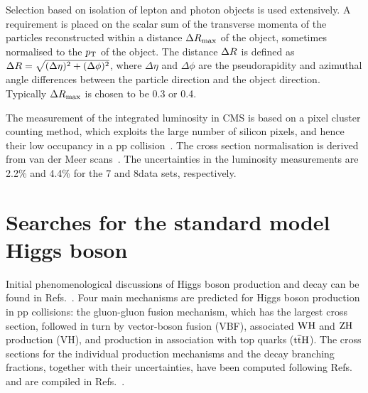\documentclass[11pt,twoside,a4paper,cmspaper,final]{cms-tdr}
\begin{document}
Selection based on isolation of lepton and photon objects is used extensively.
A requirement is placed on the scalar sum of the transverse momenta of the particles reconstructed within a
distance $\Delta R_\text{max}$ of the object, sometimes normalised to the $p_{\mathrm{T}}$ of the object. The distance $\Delta R$ is defined as $\Delta R = \sqrt{(\Delta\eta)^2+(\Delta\phi)^2}$, where
$\Delta\eta$ and $\Delta\phi$ are the pseudorapidity and azimuthal angle
differences between the particle direction and the object direction.
Typically  $\Delta R_\text{max}$ is chosen to be 0.3 or 0.4.

The measurement of the integrated luminosity in CMS is based on a
pixel cluster counting method, which exploits the large number of silicon
pixels, and hence their low occupancy in a {pp} collision~\cite{CMS-PAS-SMP-12-008}.
The cross section normalisation is derived from van der Meer
scans~\cite{vanderMeer:296752}.
The uncertainties in the luminosity measurements are 2.2\% and 4.4\% for the 7\TeV
and 8\TeV data sets, respectively.

\section{Searches for the standard model Higgs boson}\label{sec:Strategy}

Initial phenomenological discussions of Higgs boson production and
decay can be found in Refs.~\cite{Ellis:1975ap,Georgi:1977gs,Glashow:1978ab,Cahn:1986zv,Gunion:1987ke,Rainwater:1997dg,Rainwater:1998kj,Rainwater:1999sd}.
Four main mechanisms are predicted for Higgs boson production in pp
collisions:
the gluon-gluon fusion mechanism, which
has the largest cross section,
followed in turn by vector-boson fusion (VBF),
associated $\mathrm{W}\mathrm{H}$ and $\mathrm{Z}\mathrm{H}$ production (VH),
and production in association with top quarks ($\mathrm{t}\overline{\mathrm{t}}\mathrm{H}$).
The cross sections for the individual production mechanisms
and the decay branching fractions, together with their uncertainties,
have been computed following
Refs.~\cite{
      Djouadi:1991tka,
      Dawson:1990zj, Spira:1995rr,
      Harlander:2002wh,Anastasiou:2002yz,Ravindran:2003um,
      Catani:2003zt,
      Aglietti:2004nj, Degrassi:2004mx,
      Actis:2008ug,
      Anastasiou:2008tj,deFlorian:2009hc,Baglio:2010ae,deFlorian:2012yg,
      Bozzi:2005wk,deFlorian:2011xf,
      Passarino:2010qk,
      Stewart:2011cf,
      Djouadi:1997yw,hdecay2,
      Bredenstein:2006rh,Bredenstein:2006ha,
      Actis:2008ts,
      Denner:2011mq,
      Ciccolini:2007jr,Ciccolini:2007ec, Figy:2003nv,
      Arnold:2008rz,
      Bolzoni:2010xr,
      Han:1991ia,
      Brein:2003wg,
      Ciccolini:2003jy,
      Hamberg:1990np,
      Denner:2011rn,Ferrera:2011bk,
      Beenakker:2001rj,Beenakker:2002nc,
      Dawson:2002tg,Dawson:2003zu,
      Botje:2011sn,Alekhin:2011sk,Lai:2010vv,Martin:2009iq,Ball:2011mu,
      Baglio:2010ae,Anastasiou:2012hx}
and are compiled in
Refs.~\cite{LHCHiggsCrossSectionWorkingGroup:2011ti,Dittmaier:2012vm}.
\end{document}
